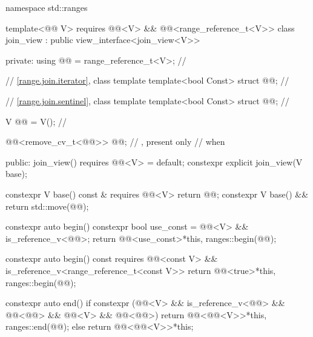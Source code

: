 %
%
%
%
\begin{codeblock}
namespace std::ranges {
  template<@@ V>
    requires @@<V> && @@<range_reference_t<V>>
  class join_view : public view_interface<join_view<V>> {
  private:
    using @@ = range_reference_t<V>;                  // \expos

    // \ref{range.join.iterator}, class template 
    template<bool Const>
      struct @@;                                      // \expos

    // \ref{range.join.sentinel}, class template 
    template<bool Const>
      struct @@;                                      // \expos

    V @@ = V();                                          // \expos

    @@<remove_cv_t<@@>> @@;    // \expos, present only
                                                            // when 

  public:
    join_view() requires @@<V> = default;
    constexpr explicit join_view(V base);

    constexpr V base() const & requires @@<V> { return @@; }
    constexpr V base() && { return std::move(@@); }

    constexpr auto begin() {
      constexpr bool use_const = @@<V> &&
                                 is_reference_v<@@>;
      return @@<use_const>{*this, ranges::begin(@@)};
    }

    constexpr auto begin() const
      requires @@<const V> &&
               is_reference_v<range_reference_t<const V>>
    { return @@<true>{*this, ranges::begin(@@)}; }

    constexpr auto end() {
      if constexpr (@@<V> &&
                    is_reference_v<@@> && @@<@@> &&
                    @@<V> && @@<@@>)
        return @@<@@<V>>{*this, ranges::end(@@)};
      else
        return @@<@@<V>>{*this};
    }

}}
\end{codeblock}
